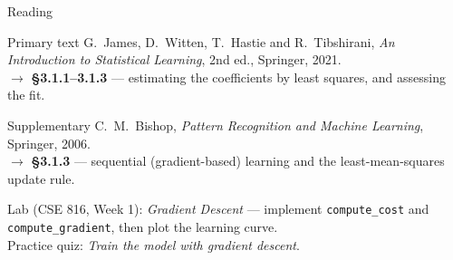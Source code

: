 \documentclass[aspectratio=169,11pt]{beamer}
\begin{document}
\begin{frame}{Reading}
  \begin{block}{Primary text}
    G.~James, D.~Witten, T.~Hastie and R.~Tibshirani,
    \emph{An Introduction to Statistical Learning}, 2nd ed., Springer, 2021.\\[2pt]
    \hfill{\small$\rightarrow$ \textbf{\S3.1.1--3.1.3} --- estimating the coefficients by
    least squares, and assessing the fit.}
  \end{block}
  \begin{block}{Supplementary}
    C.~M.~Bishop, \emph{Pattern Recognition and Machine Learning}, Springer, 2006.\\[2pt]
    \hfill{\small$\rightarrow$ \textbf{\S3.1.3} --- sequential (gradient-based) learning and the
    least-mean-squares update rule.}
  \end{block}
  \vspace{2mm}
  \begin{center}
    \small\color{cugray}
    Lab (CSE 816, Week 1): \emph{Gradient Descent} --- implement
    \texttt{compute\_cost} and \texttt{compute\_gradient}, then plot the learning
    curve.\\
    Practice quiz: \emph{Train the model with gradient descent}.
  \end{center}
\end{frame}
\end{document}
